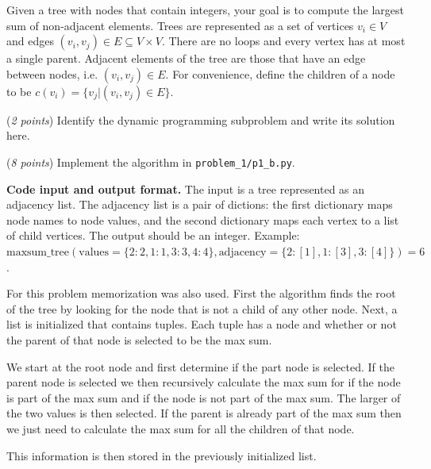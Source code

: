 \documentclass{hw}
\newcommand{\io}{\textbf{Code input and output format.} }
\begin{document}
\begin{problem}
\begin{subproblem}
Given a tree with nodes that contain integers,
your goal is to compute the largest sum of non-adjacent elements.
Trees are represented as a set of vertices
$v_i \in V$ and edges $(v_i, v_j) \in E \subseteq V\times V$.
There are no loops and every vertex has at most a single parent.
Adjacent elements of the tree are those that have an edge between nodes, i.e. $(v_i,v_j)\in E$.
For convenience, define the children of a node to be $c(v_i) = \{v_j | (v_i,v_j)\in E\}$.

(\textit{2 points}) Identify the dynamic programming subproblem and write its solution here.

(\textit{8 points}) Implement the algorithm in \texttt{problem\_1/p1\_b.py}.
\end{subproblem}

\io The input is a tree represented as an adjacency list.
The adjacency list is a pair of dictions:
the first dictionary maps node names to node values,
and the second dictionary maps each vertex to a list of
child vertices.
The output should be an integer.
Example: $\text{maxsum\_tree}(\text{values} = \{2: 2, 1:1, 3:3, 4:4\}, \text{adjacency}=\{2: [1], 1: [3], 3: [4]\}) = 6$.


\end{problem}

\begin{solution}
For this problem memorization was also used. First the algorithm finds the root of the tree by looking for the node that is not a child of any other node. Next, a list is initialized that contains tuples. Each tuple has a node and whether or not the parent of that node is selected to be the max sum.

We start at the root node and first determine if the part node is selected. If the parent node is selected we then recursively calculate the max sum for if the node is part of the max sum and if the node is not part of the max sum. The larger of the two values is then selected. If the parent is already part of the max sum then we just need to calculate the max sum for all the children of that node. 

This information is then stored in the previously initialized list.
\end{solution}

\newpage


\newcommand{\rank}{\textnormal{rank}}
\newcommand{\Colon}{:}
\newcommand{\dotdot}{..}
\newcommand{\numinv}{\textrm{NI}}
\newcommand{\numlargeinv}{\textrm{NLI}}
\end{document}
